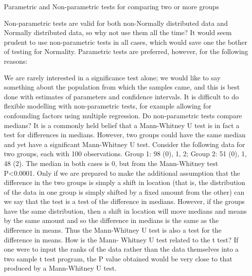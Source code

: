 Parametric and Non-parametric tests for comparing two or more groups


Non-parametric tests are valid for both non-Normally distributed data and Normally distributed data, so why not use them all the time? It would seem prudent to use non-parametric tests in all cases, which would save one the bother of testing for Normality. Parametric tests are preferred, however, for the following reasons:

We are rarely interested in a significance test alone; we would like to say something about the population from which the samples came, and this is best done with estimates of parameters and confidence intervals.
It is difficult to do flexible modelling with non-parametric tests, for example allowing for confounding factors using multiple regression.
Do non-parametric tests compare medians? 
It is a commonly held belief that a Mann-Whitney U test is in fact a test for differences in medians. However, two groups could have the same median and yet have a significant Mann-Whitney U test. Consider the following data for two groups, each with 100 observations. Group 1: 98 (0), 1, 2; Group 2: 51 (0), 1, 48 (2). The median in both cases is 0, but from the Mann-Whitney test P<0.0001. Only if we are prepared to make the additional assumption that the difference in the two groups is simply a shift in location (that is, the distribution of the data in one group is simply shifted by a fixed amount from the other) can we say that the test is a test of the difference in medians. However, if the groups have the same distribution, then a shift in location will move medians and means by the same amount and so the difference in medians is the same as the difference in means. Thus the Mann-Whitney U test is also a test for the difference in means. How is the Mann- Whitney U test related to the t test? If one were to input the ranks of the data rather than the data themselves into a two sample t test program, the P value obtained would be very close to that produced by a Mann-Whitney U test.
